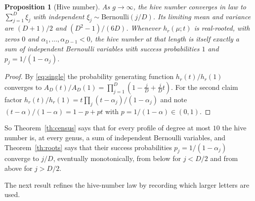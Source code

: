 \documentclass[11pt,a4paper]{article}
\newtheorem{proposition}[theorem]{Proposition}
\theoremstyle{definition}\newtheorem{definition}[theorem]{Definition}
\theoremstyle{remark}\newtheorem{remark}[theorem]{Remark}\newtheorem{example}[theorem]{Example}
\numberwithin{equation}{section}
\begin{document}
\begin{proposition}[Hive number]\label{pr:hive}
As $g\to\infty$, the hive number converges in law to $\sum_{j=1}^{D}\xi_j$ with independent $\xi_j\sim\mathrm{Bernoulli}(j/D)$. Its limiting mean and variance are $(D+1)/2$ and $(D^2-1)/(6D)$. Whenever $h_r(\mu;t)$ is real-rooted, with zeros $0$ and $\alpha_1,\dots,\alpha_{D-1}<0$, the hive number at that length is itself exactly a sum of independent Bernoulli variables with success probabilities $1$ and $p_j=1/(1-\alpha_j)$.
\end{proposition}
\begin{proof}
By \eqref{eq:single} the probability generating function $h_r(t)/h_r(1)$ converges to $A_D(t)/A_D(1)=\prod_{j=1}^D(1-\frac jD+\frac jDt)$. For the second claim factor $h_r(t)/h_r(1)=t\prod_j(t-\alpha_j)/(1-\alpha_j)$ and note $(t-\alpha)/(1-\alpha)=1-p+pt$ with $p=1/(1-\alpha)\in(0,1)$.
\end{proof}

So Theorem~\ref{th:census} says that for every profile of degree at most $10$ the hive number is, at every genus, a sum of independent Bernoulli variables, and Theorem~\ref{th:roots} says that their success probabilities $p_j=1/(1-\alpha_j)$ converge to $j/D$, eventually monotonically, from below for $j<D/2$ and from above for $j>D/2$.

The next result refines the hive-number law by recording which larger letters are used.
\end{document}
